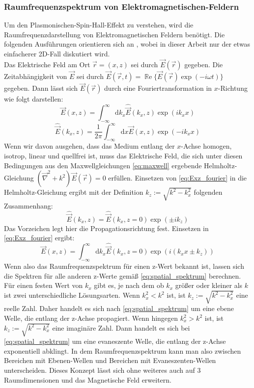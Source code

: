 \documentclass[titlepage]{article}
\renewcommand{\Re}{\operatorname{\mathbb{R}e}}
\begin{document}
	\subsubsection{Raumfrequenzspektrum von Elektromagnetischen-Feldern}
		Um den Plasmonischen-Spin-Hall-Effekt zu verstehen, wird die Raumfrequenzdarstellung von Elektromagnetischen Feldern benötigt. Die folgenden Ausführungen orientieren sich an \cite{Novotny.2012b}, wobei in dieser Arbeit nur der etwas einfacherer 2D-Fall diskutiert wird.\\		
		Das Elektrische Feld am Ort $\vec{r} = (x, z) $ sei durch $\vec{E}({\vec{r}})$ gegeben.
		Die Zeitabhängigkeit von $\vec{E}$ sei durch $\vec{E}({\vec{r}, t})=\Re\{\vec{E}({\vec{r}})\exp(-i\omega t)\}$ gegeben. Dann lässt sich $\vec{E}({\vec{r}})$ durch eine Fouriertransformation in $x$-Richtung wie folgt darstellen:
		\begin{equation}
			\label{eq:Exz_fourier}
			\vec{E}(x,z) = \int_{-\infty}^{\infty}\mathrm{d}{k_x}\hat{\vec{E}}(k_x,z)\exp(ik_xx)				
		\end{equation}
		\begin{equation}
			\label{eq:EKxz_fourier}
			\hat{\vec{E}}(k_x,z) = \dfrac{1}{2\pi}\int_{-\infty}^{\infty}\mathrm{d}x\vec{E}(x,z)\exp(-ik_xx)
		\end{equation}
		Wenn wir davon ausgehen, dass das Medium entlang der $x$-Achse homogen, isotrop, linear und quellfrei ist, muss das Elektrische Feld, die sich unter diesen Bedingungen aus den Maxwellgleichungen \eqref{eq:maxwell} ergebende Helmholtz-Gleichung $(\vec{\nabla}^2+k^2)\vec{E}({\vec{r}}) = 0$ erfüllen. Einsetzen von \eqref{eq:Exz_fourier} in die Helmholtz-Gleichung ergibt mit der Definition $k_z := \sqrt{k^2-k_x^2}$ folgenden Zusammenhang:
		\begin{equation}
			\label{eq:spatial_spektrum}
		\hat{\vec{E}}(k_x,z) =\hat{\vec{E}}(k_x,z= 0) \exp(\pm ik_ z)
		\end{equation}
	Das Vorzeichen legt hier die Propagationsrichtung fest.
	Einsetzen in \eqref{eq:Exz_fourier} ergibt:
		\begin{equation}
			\label{eq:Espatial_spektrum}
			\vec{E}(x,z) = \int_{-\infty}^{\infty}\mathrm{d}{k_x}\hat{\vec{E}}(k_x,z= 0)\exp(i(k_xx\pm k_ z))
		\end{equation}
	Wenn also das Raumfrequenzspektrum für einen z-Wert bekannt ist, lassen sich die Spektren für alle anderen z-Werte gemäß \eqref{eq:spatial_spektrum} berechnen. Für einen festen Wert von $k_x$ gibt es, je nach dem ob $k_x$ größer oder kleiner als $k$ ist zwei unterschiedliche Lösungsarten. Wenn $k_x^2 < k^2$ ist, ist $k_z := \sqrt{k^2-k_x^2}$ eine reelle Zahl. Daher handelt es sich nach \eqref{eq:spatial_spektrum} um eine ebene Welle, die entlang der z-Achse propagiert.
	Wenn hingegen $k_x^2 > k^2$ ist, ist $k_z := \sqrt{k^2-k_x^2}$ eine imaginäre Zahl. Dann handelt es sich bei \eqref{eq:spatial_spektrum} um eine evaneszente Welle, die entlang der z-Achse exponentiell abklingt. In dem Raumfrequenzspektrum kann man also zwischen Bereichen mit Ebenen-Wellen und  Bereichen mit Evaneszenten-Wellen unterscheiden. Dieses Konzept lässt sich ohne weiteres auch auf 3 Raumdimensionen und das Magnetische Feld erweitern.
\end{document}
